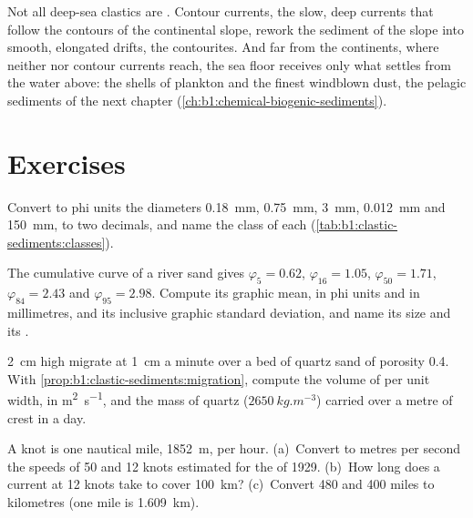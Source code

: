 Not all deep-sea clastics are . Contour currents, the slow, deep
currents that follow the contours of the continental slope, rework the sediment
of the slope into smooth, elongated drifts, the contourites. And far from the
continents, where neither  nor contour currents reach, the
sea floor receives only what settles from the water above: the shells of
plankton and the finest windblown dust, the pelagic sediments of the next
chapter (\cref{ch:b1:chemical-biogenic-sediments}).

\section{Exercises}

\begin{exercise}[$\star$]\label{exo:b1:clastic-sediments:1}
Convert to phi units the diameters \qty{0.18}{mm}, \qty{0.75}{mm},
\qty{3}{mm}, \qty{0.012}{mm} and \qty{150}{mm}, to two decimals, and name the
class of each (\cref{tab:b1:clastic-sediments:classes}).
\end{exercise}

\begin{exercise}[$\star$]\label{exo:b1:clastic-sediments:2}
The cumulative curve of a river sand gives $\varphi_5 = 0.62$, $\varphi_{16} =
1.05$, $\varphi_{50} = 1.71$, $\varphi_{84} = 2.43$ and $\varphi_{95} = 2.98$.
Compute its graphic mean, in phi units and in millimetres, and its inclusive
graphic standard deviation, and name its size and its .
\end{exercise}

\begin{exercise}[$\star$]\label{exo:b1:clastic-sediments:3}
 \qty{2}{cm} high migrate at \qty{1}{cm} a minute over a bed of quartz
sand of porosity \num{0.4}. With \cref{prop:b1:clastic-sediments:migration},
compute the volume of  per unit width, in \si{m^2.s^{-1}}, and the mass
of quartz ($\qty{2650}{kg.m^{-3}}$) carried over a metre of crest in a day.
\end{exercise}

\begin{exercise}[$\star$]\label{exo:b1:clastic-sediments:4}
A knot is one nautical mile, \qty{1852}{m}, per hour. (a)~Convert to metres
per second the speeds of 50 and 12 knots estimated for the  of
1929. (b)~How long does a current at 12 knots take to cover \qty{100}{km}?
(c)~Convert 480 and 400 miles to kilometres (one mile is \qty{1.609}{km}).
\end{exercise}

